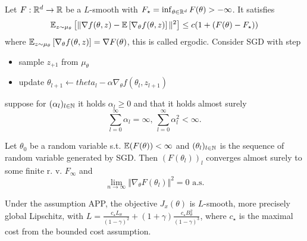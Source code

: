 \begin{theorem}\label{thm:59}
    Let \(F:\mathbb{R}^d\to\mathbb{R}\) be a \(L\)-smooth with \(F_\star=\inf_{\theta\in\mathbb{R}^d}F(\theta)>-\infty\).
    It satisfies 
    \[\mathbb{E}_{z\sim \mu_\theta}\left[\Vert \nabla f(\theta,z)-\mathbb{E}\left[\nabla_\theta f(\theta,z)\right]\Vert^2\right]\leq c(1+(F(\theta)-F_\star))\] 
    where \(\mathbb{E}_{z\sim \mu_\theta}\left[\nabla_\theta f(\theta,z)\right]=\nabla F(\theta)\), this is called ergodic.
    Consider SGD with step 
    \begin{itemize}
        \item sample \(z_{+1}\) from \(\mu_\theta\) %
        \item update \(\theta_{l+1}\leftarrow theta_l-\alpha \nabla_\theta f(\theta_l,z_{l+1})\)
    \end{itemize}
    suppose for \((\alpha_l)_{l\in \mathbb{N}}\) it holds \(\alpha_l\geq 0\) and that it holds almost surely 
    \[\sum_{l=0}^{\infty}\alpha_l=\infty,\ \sum_{l=0}^{\infty}\alpha_l^2<\infty.\]
    
    Let \(\theta_0\) be a random variable s.t. \(\mathbb{E}(F(\theta))<\infty\) and \((\theta_l)_{l\in\mathbb{N}}\)
    is the sequence of random variable generated by SGD. Then \((F({\theta_l}))_l\) converges almost surely 
    to some finite r. v. \(F_\infty\) and 
    \[\lim_{n\to\infty}\Vert \nabla_\theta F(\theta_l)\Vert^2=0\text{ a.s.}\] 
\end{theorem}

\begin{lemma}\label{lem:60} %
    Under the assumption APP, the objective \(J_x(\theta)\) is \(L\)-smooth, more precisely global Lipschitz, with 
    \(L=\frac{c_\star L_\theta}{(1-\gamma)^2}+(1+\gamma)\frac{c_\star B_\theta^2}{(1-\gamma)^3}\),
    where \(c_\star\) is the maximal cost from the bounded cost assumption.
\end{lemma}

